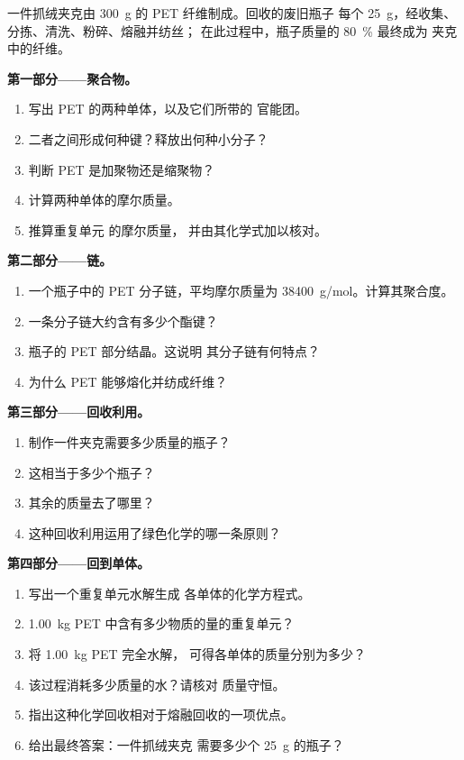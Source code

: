 \begin{problem}
\label{pb:g12:polymers:1}
一件抓绒夹克由 \qty{300}{g} 的 PET 纤维制成。回收的废旧瓶子
每个 \qty{25}{g}，经收集、分拣、清洗、粉碎、熔融并纺丝；
在此过程中，瓶子质量的 \qty{80}{\percent} 最终成为
夹克中的纤维。

\medskip
\noindent\textbf{第一部分——聚合物。}
\begin{enumerate}
  \item 写出 PET 的两种单体，以及它们所带的
        官能团。
  \item 二者之间形成何种键？释放出何种小分子？
  \item 判断 PET 是加聚物还是缩聚物？
  \item 计算两种单体的摩尔质量。
  \item 推算重复单元  的摩尔质量，
        并由其化学式加以核对。
\end{enumerate}

\medskip
\noindent\textbf{第二部分——链。}
\begin{enumerate}[resume]
  \item 一个瓶子中的 PET 分子链，平均摩尔质量为
        \qty{38400}{g/mol}。计算其聚合度。
  \item 一条分子链大约含有多少个酯键？
  \item 瓶子的 PET 部分结晶。这说明
        其分子链有何特点？
  \item 为什么 PET 能够熔化并纺成纤维？
\end{enumerate}

\medskip
\noindent\textbf{第三部分——回收利用。}
\begin{enumerate}[resume]
  \item 制作一件夹克需要多少质量的瓶子？
  \item 这相当于多少个瓶子？
  \item 其余的质量去了哪里？
  \item 这种回收利用运用了绿色化学的哪一条原则？
\end{enumerate}

\medskip
\noindent\textbf{第四部分——回到单体。}
\begin{enumerate}[resume]
  \item 写出一个重复单元水解生成
        各单体的化学方程式。
  \item \qty{1.00}{kg} PET 中含有多少物质的量的重复单元？
  \item 将 \qty{1.00}{kg} PET 完全水解，
        可得各单体的质量分别为多少？
  \item 该过程消耗多少质量的水？请核对
        质量守恒。
  \item 指出这种化学回收相对于熔融回收的一项优点。
  \item 给出最终答案：一件抓绒夹克
        需要多少个 \qty{25}{g} 的瓶子？
\end{enumerate}
\end{problem}
